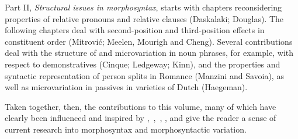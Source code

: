 \documentclass[output=paper]{langsci/langscibook}
\begin{document}
Part II, \emph{Structural issues in morphosyntax}, starts with chapters
reconsidering properties of relative pronouns and relative clauses (Daskalaki;
Douglas). The following chapters deal with second-position and third-position
effects in constituent order (Mitrović; Meelen, Mourigh and Cheng). Several
contributions deal with the structure of and microvariation in noun phrases,
for example, with respect to demonstratives (Cinque; Ledgeway; Kinn), and the
properties and syntactic representation of person splits in Romance (Manzini
and Savoia), as well as microvariation in passives in varieties of Dutch
(Haegeman).

Taken together, then, the contributions to this volume, many of which have
clearly been influenced and inspired by
\textcite{Roberts2010,Roberts2012},~\textcite{RobRou2003},~\textcite{RobHol2010},
\textcite{BibRob2012,BibRob2015}, and \textcite{BibHolRob2014} give the reader
a sense of current research into morphosyntax and morphosyntactic variation.

{\sloppy
    \printbibliography[heading=subbibliography,notkeyword=this]
}
\end{document}
